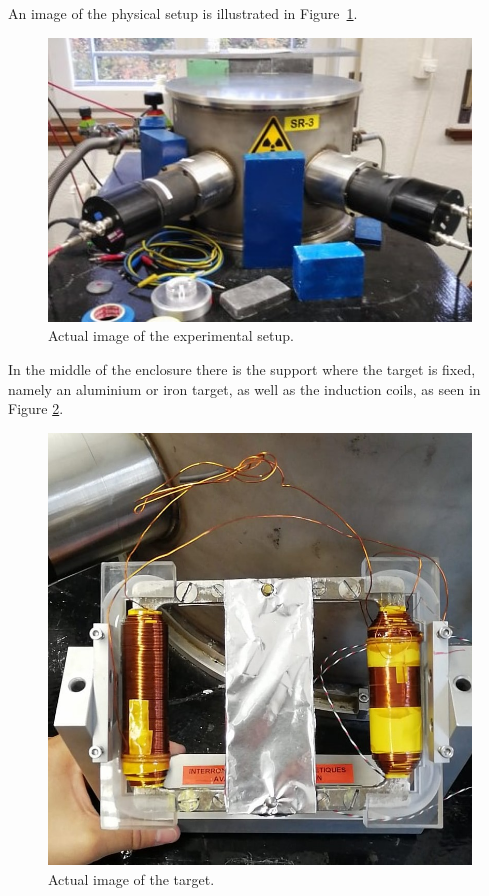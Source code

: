 \documentclass[10pt,swedish, openany]{book}
\begin{document}
An image of the physical setup is illustrated in Figure~\ref{fig:setupexp}.

\begin{figure}[h]
\includegraphics[scale=0.8]{experimentalsetup.jpg}
\centering
\caption{Actual image of the experimental setup.}
\label{fig:setupexp}
\end{figure}

In the middle of the enclosure there is the support where the target is fixed, namely an aluminium or iron target, as well as the induction coils, as seen in Figure \ref{fig:cible}.

\begin{figure}[H]
\includegraphics[scale=0.3]{cible.jpeg}
\centering
\caption{Actual image of the target.}
\label{fig:cible}
\end{figure}
\end{document}

